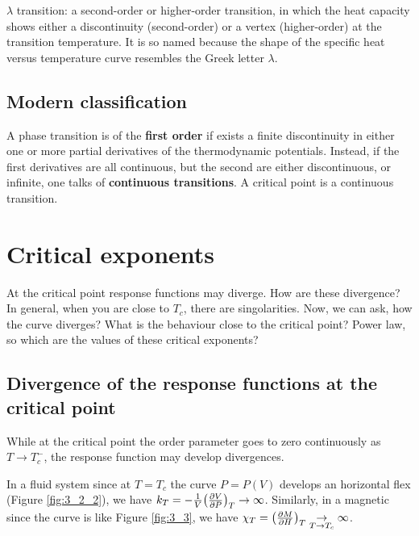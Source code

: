 \documentclass[../../Main/Main.tex]{subfiles}
\begin{document}
\begin{remark}
\( \lambda  \) transition: a second-order or higher-order transition, in which the heat capacity shows either a discontinuity (second-order) or a vertex (higher-order) at the transition temperature.  It is so named because the shape of the specific heat versus temperature curve resembles the Greek letter \( \lambda  \).
\end{remark}

\subsection{Modern classification}
A phase transition is of the \textbf{first order} if exists a finite discontinuity in either one or more partial derivatives of the thermodynamic potentials. Instead, if the first derivatives are all continuous, but the second are either discontinuous, or infinite, one talks of \textbf{continuous transitions}.
A critical point is a continuous transition.




\section{Critical exponents}

At the critical point response functions may diverge. How are these divergence?
In general, when you are close to \( T_c \), there are singolarities. Now, we can ask, how the curve diverges? What is the behaviour close to the critical point? Power law, so which are the values of these critical exponents?

\subsection{Divergence of the response functions at the critical point}
\label{sec:3_1}
While at the critical point the order parameter goes to zero continuously as \( T \rightarrow T_c^- \), the response function may develop divergences.
\begin{example}{}{}
In a fluid system since at \( T=T_c \) the curve \( P = P(V) \) develops an horizontal flex (Figure \ref{fig:3_2_2}), we have \( k_T = -\frac{1}{V} \qty(\pdv{V}{P} )_T  \rightarrow \infty  \). Similarly, in a magnetic since the curve is like Figure \ref{fig:3_3}, we have \( \chi _T = \qty(\pdv{M}{H} )_T \underset{T \rightarrow  T_c}{\rightarrow } \infty   \).

\end{example}
\end{document}
